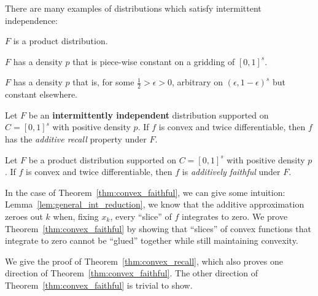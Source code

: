 \begin{example} There are many examples of distributions which satisfy intermittent independence:
\begin{packed_enum}
\item $F$ is a product distribution.
\item $F$ has a density $p$ that is piece-wise constant on a gridding of $[0,1]^s$.
\item $F$ has a density $p$ that is, for some $\frac{1}{2} > \epsilon > 0$,  arbitrary on $(\epsilon, 1-\epsilon)^s$ but constant elsewhere. 
\end{packed_enum}
\end{example}

\begin{theorem}
\label{thm:convex_recall}
Let $F$ be an \textbf{intermittently independent} distribution supported on $C=[0,1]^s$ with positive density $p$. If $f$ is convex and twice differentiable, then $f$ has the \emph{additive recall} property under $F$.
\end{theorem}

\begin{theorem}
\label{thm:convex_faithful}
Let $F$ be a product distribution supported on $C=[0,1]^s$ with positive density $p$. If $f$ is convex and twice differentiable, then $f$ is \emph{additively faithful} under $F$.
\end{theorem}



In the case of Theorem~\ref{thm:convex_faithful}, we can give some intuition: Lemma~\ref{lem:general_int_reduction}, we know that the
additive approximation zeroes out $k$ when, fixing $x_k$, every
``slice'' of $f$ integrates to zero. We prove
Theorem~\ref{thm:convex_faithful} by showing that ``slices'' of convex
functions that integrate to zero cannot be ``glued'' together while
still maintaining convexity.

We give the proof of Theorem~\ref{thm:convex_recall}, which also proves one direction of Theorem~\ref{thm:convex_faithful}. The other direction of Theorem~\ref{thm:convex_faithful} is trivial to show.

